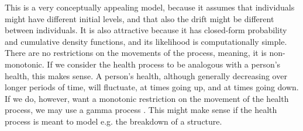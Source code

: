 This is a very conceptually appealing model, because it assumes that individuals might have different initial levels, and that also the drift might be different between individuals. It is also attractive because it has closed-form probability and cumulative density functions, and its likelihood is computationally simple. There are no restrictions on the movements of the process, meaning, it is non-monotonic. If we consider the health process to be analogous with a person's health, this makes sense. A person's health, although generally decreasing over longer periods of time, will fluctuate, at times going up, and at times going down. If we do, however, want a monotonic restriction on the movement of the health process, we may use a gamma process \citep{leewhitmore2006}. This might make sense if the health process is meant to model e.g. the breakdown of a structure.


